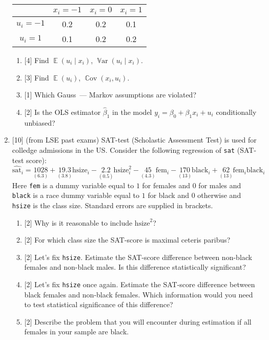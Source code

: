 \documentclass[12pt]{article}
\DeclareMathOperator{\Cov}{\mathbb{C}ov}
\DeclareMathOperator{\Var}{\mathbb{V}ar}
\DeclareMathOperator{\E}{\mathbb{E}}
\begin{document}
\begin{enumerate}
    \begin{tabular}{*{4}{c}}
        \toprule
        & $x_i=-1$ & $x_i=0$ & $x_i=1$ \\
        \midrule
        $u_i=-1$ & 0.2 & 0.2 & 0.1  \\
        $u_i=1$ & 0.1 & 0.2 & 0.2  \\
        \bottomrule
        \end{tabular}
        

    \begin{enumerate}
        \item {[4]} Find $\E(u_i \mid x_i)$, $\Var(u_i \mid x_i)$.
        \item {[3]} Find $\E(u_i)$, $\Cov(x_i, u_i)$.
        \item {[1]} Which Gauss~— Markov assumptions are violated?
        \item {[2]} Is the OLS estimator $\hat \beta_1$ in the model $y_i = \beta_0 + \beta_1 x_i + u_i$ conditionally unbiased?
    \end{enumerate}


    \item {[10]} (from LSE past exams) 
    SAT-test (Scholastic Assessment Test) is used for colledge admissions in the US.
    Consider the following regression of \verb|sat| (SAT-test score):
    \[
    \widehat{\text{sat}}_i = \underset{(6.3)}{1028} 
    + \underset{(3.8)}{19.3} \text{hsize}_i - \underset{(0.5)}{2.2} \text{hsize}_i^2 
    - \underset{(4.3)}{45}\text{fem}_i
    - \underset{(13)}{170}\text{black}_i
    + \underset{(13)}{62}\text{fem}_i\text{black}_i
    \]
    Here \verb|fem| is a dummy variable equal to $1$ for females and $0$ for males 
    and \verb|black| is a race dummy variable equal to $1$ for black and $0$ otherwise
    and \verb|hsize| is the class size.  
    Standard errors are supplied in brackets. 

    \begin{enumerate}
        \item {[2]} Why is it reasonable to include $\text{hsize}^2$?
        \item {[2]} For which class size the SAT-score is maximal ceteris paribus?
        \item {[2]} Let's fix \verb|hsize|. 
        Estimate the SAT-score difference between  non-black females and non-black males.
        Is this difference statistically significant?
        \item {[2]} Let's fix \verb|hsize| once again. 
        Estimate the SAT-score difference between  black females and non-black females.
        Which information would you need to test statistical significance of this difference?
        \item {[2]} Describe the problem that you will encounter during estimation 
        if all females in your sample are black.
    \end{enumerate}
\end{enumerate}
\end{document}
